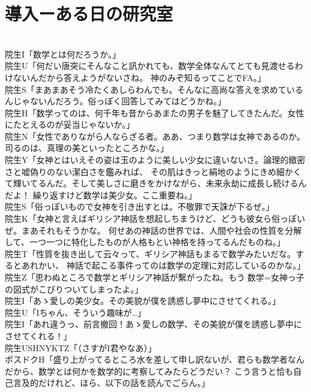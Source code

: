 \section{導入ーある日の研究室}\mbox{}\\
	院生I「数学とは何だろうか。」\\
	院生U「何だい唐突にそんなこと訊かれても、数学全体なんてとても見渡せるわけないんだから答えようがないさね。
		神のみぞ知るってことでFA。」\\
	院生S「まあまあそう冷たくあしらわんでも。そんなに高尚な答えを求めているんじゃないんだろう。俗っぽく回答してみてはどうかね。」\\
	院生H「数学ってのは、何千年も昔からあまたの男子を魅了してきたんだ。女性にたとえるのが妥当じゃないか。」\\
	院生N「女性でありながら人ならざる者。ああ、つまり数学は女神であるのか。司るのは、真理の美といったところかな。」\\
	院生Y「女神とはいえその姿は玉のように美しい少女に違いないさ。論理的緻密さと嘘偽りのない潔白さを鑑みれば、
	その肌はきっと絹地のようにきめ細かくて輝いてるんだ。そして美しさに磨きをかけながら、未来永劫に成長し続けるんだよ！
	繰り返すけど数学は美少女。ここ重要ね。」\\
	院生S「俗っぽいもので女神を引き出すとは。不敬罪で天誅が下るぜ。」\\
	院生K「女神と言えばギリシア神話を想起しちまうけど、どうも彼女ら俗っぽいぜ。まあそれもそうかな。
		何せあの神話の世界では、人間や社会の性質を分解して、一つ一つに特化したものが人格もとい神格を持ってるんだものね。」\\
	院生T「性質を抜き出して云々って、ギリシア神話もまるで数学みたいだな。するとあれかい、
		神話で起こる事件ってのは数学の定理に対応しているのかな。」\\
	院生Z「思わぬところで数学とギリシア神話が繋がったね。もう$\mbox{数学}=\mbox{女神っ子}$の図式がこびりついてしまったよ。」\\
	院生I「あゝ愛しの美少女。その美貌が僕を誘惑し夢中にさせてくれる。」\\
	院生U「Iちゃん、そういう趣味が…」\\
	院生I「あれ違うっ、前言撤回！あゝ愛しの数学、その美貌が僕を誘惑し夢中にさせてくれる！」\\
	院生USHNYKTZ「（さすがI君やなあ）」\\
	ポスドクH「盛り上がってるところ水を差して申し訳ないが、君らも数学者なんだから、数学とは何かを数学的に考察してみたらどうだい？
		こう言うと恰も自己言及的だけれど、ほら、以下の話を読んでごらん。」

